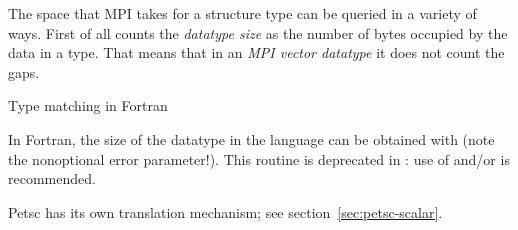 
The space that MPI takes for a structure type can be queried in a
variety of ways. First of all  counts the
\emph{datatype size} as the 
number of bytes occupied by the data in a type. That means that in an
\emph{MPI vector datatype} it does not
count the gaps.
%

\begin{comment}
In C, the \indexmpidef{MPI_Datatype} type is defined through the pre-processor,
allowing you to write:
\cverbatimsnippet{datatypevar}
\end{comment}

 {Type matching in Fortran}
\label{sec:mpi-type-match-f}

In Fortran, the size of the datatype in the language can be obtained with
 (note the nonoptional error parameter!).
This routine is deprecated in : use of
 and/or  is recommended.


Petsc has its own translation mechanism; see section~\ref{sec:petsc-scalar}.


